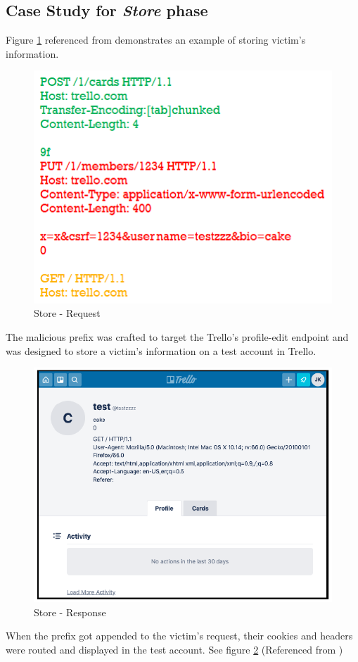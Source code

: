 \subsection{Case Study for \textit{Store} phase}
Figure \ref{fig:Store_Request} referenced from \cite{b6} demonstrates an example of storing victim's information.
\begin{figure}
	\includegraphics{images/Store_Request}
	\caption{Store - Request}
	\label{fig:Store_Request}
\end{figure}
The malicious prefix was crafted to target the Trello's profile-edit endpoint and was designed to store a victim's information on a test account in Trello.\\
\begin{figure}
	\includegraphics[width=14cm]{images/Store_Response}
	\caption{Store - Response}
	\label{fig:Store_Response}
\end{figure}
When the prefix got appended to the victim's request, their cookies and headers were routed and displayed in the test account. See figure \ref{fig:Store_Response} (Referenced from \cite{b6})\\

